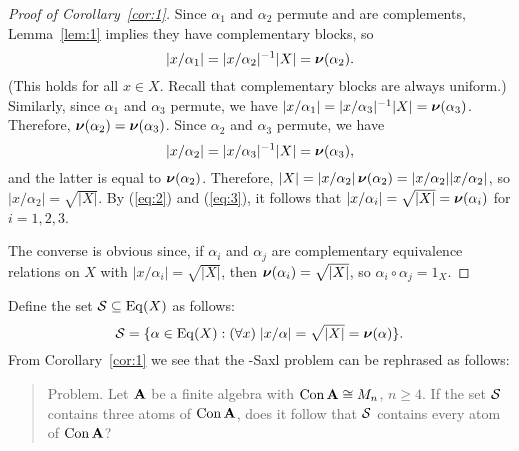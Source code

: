 \begin{proof}[Proof of Corollary~\ref{cor:1}]
Since $\alpha_1$ and $\alpha_2$ permute and are complements, Lemma~\ref{lem:1}
implies they have complementary blocks, so
\begin{equation}
  \label{eq:2}
|x/\alpha_1| = |x/\alpha_2|^{-1}  |X|= \operatorname{\boldsymbol{\nu}}(\alpha_2).
\end{equation}
(This holds for all $x\in X$. Recall that complementary blocks are always
uniform.) 
Similarly, since $\alpha_1$ and $\alpha_3$ permute, we have
$|x/\alpha_1| = |x/\alpha_3|^{-1}  |X| = \operatorname{\boldsymbol{\nu}}(\alpha_3)$.
Therefore, $\operatorname{\boldsymbol{\nu}}(\alpha_2) = \operatorname{\boldsymbol{\nu}}(\alpha_3)$.  Since 
$\alpha_2$ and $\alpha_3$ permute, we have
\begin{equation}
  \label{eq:3}
|x/\alpha_2| = |x/\alpha_3|^{-1}  |X|= \operatorname{\boldsymbol{\nu}}(\alpha_3),
\end{equation}
and the latter is equal to $\operatorname{\boldsymbol{\nu}}(\alpha_2)$.  Therefore,
$|X| = |x/\alpha_2|  \operatorname{\boldsymbol{\nu}}(\alpha_2) = |x/\alpha_2|  |x/\alpha_2|$, so 
$|x/\alpha_2|  = \sqrt{|X|}$. By (\ref{eq:2}) and (\ref{eq:3}), it follows
that
$|x/\alpha_i| = \sqrt{|X|} = \operatorname{\boldsymbol{\nu}}(\alpha_i)$ for $i = 1, 2, 3$.

The converse is obvious since, if $\alpha_i$ and $\alpha_j$ are
complementary equivalence relations on $X$ with 
$|x/\alpha_i| = \sqrt{|X|}$, then 
$\operatorname{\boldsymbol{\nu}}(\alpha_i) = \sqrt{|X|}$, so
$\alpha_i \circ \alpha_j = 1_X$.
\end{proof}

Define the set $\mathcal{S}\subseteq \operatorname{Eq}(X)$ as follows:
\[
\mathcal{S} = \{ \alpha \in \operatorname{Eq}(X) : (\forall x) \; |x/\alpha|  
= \sqrt{|X|} = \operatorname{\boldsymbol{\nu}}(\alpha)\}.
\]
From Corollary~\ref{cor:1} we see that the \Palfy-Saxl problem can be rephrased
as follows:

\medskip

\begin{quote}
  {\sc Problem.} Let $\mathbf{A}$ be a finite algebra with $\operatorname{Con} \mathbf{A} \cong M_n$, $n\geq
  4$. %
  If the set $\mathcal{S}$ contains three atoms of
  $\operatorname{Con} \mathbf{A}$,
  does it follow that $\mathcal{S}$ contains every atom of 
  $\operatorname{Con} \mathbf{A}$?
\end{quote}

\medskip



